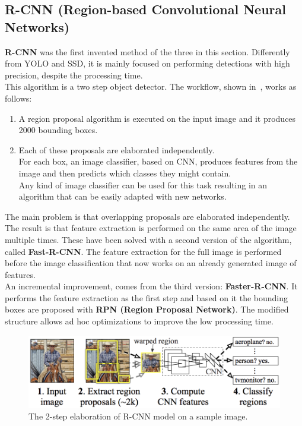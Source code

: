 \subsection{R-CNN (Region-based Convolutional Neural Networks)} \label{sec:r-cnn}
\textbf{R-CNN}\cite{r-cnn} was the first invented method of the three in this section. Differently from YOLO and SSD, it is mainly focused on performing detections with high precision, despite the processing time.\\
This algorithm is a two step object detector. The workflow, shown in~, works as follows:
\begin{enumerate}
	\item A region proposal algorithm is executed on the input image and it produces 2000 bounding boxes.
	\item Each of these proposals are elaborated independently. \\
	For each box, an image classifier, based on CNN, produces features from the image and then predicts which classes they might contain.\\
	Any kind of image classifier can be used for this task resulting in an algorithm that can be easily adapted with new networks.
\end{enumerate}
The main problem is that overlapping proposals are elaborated independently. The result is that feature extraction is performed on the same area of the image multiple times. These have been solved with a second version of the algorithm, called \textbf{Fast-R-CNN}\cite{fast-r-cnn}. The feature extraction for the full image is performed before the image classification that now works on an already generated image of features.\\
An incremental improvement, comes from the third version: \textbf{Faster-R-CNN}\cite{faster-r-cnn}. It performs the feature extraction as the first step and based on it the bounding boxes are proposed with \textbf{RPN (Region Proposal Network)}. The modified structure allows ad hoc optimizations to improve the low processing time.

\begin{figure}[!h]
	\centering
	\includegraphics[width=0.8\linewidth]{images/detection/howItWorks_rcnn}
	\caption{The 2-step elaboration of R-CNN model on a sample image.}
	\label{fig:howItWorks_rcnn}
\end{figure}



